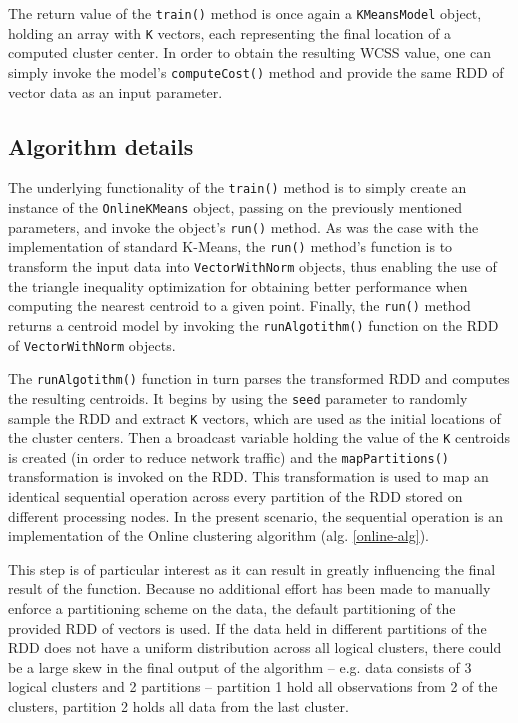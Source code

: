 \documentclass{l4proj}
\begin{document}
The return value of the \texttt{train()} method is once again a  \texttt{KMeansModel} object, holding an array with \texttt{K} vectors, each representing the final location of a computed cluster center. In order to obtain the resulting WCSS value, one can simply invoke the model's \texttt{computeCost()} method and provide the same RDD of vector data as an input parameter.

\subsection{Algorithm details}

The underlying functionality of the \texttt{train()} method is to simply create an instance of the \texttt{OnlineKMeans} object, passing on the previously mentioned parameters, and invoke the object's \texttt{run()} method. As was the case with the implementation of standard K-Means, the \texttt{run()} method's function is to transform the input data into \texttt{VectorWithNorm} objects, thus enabling the use of the triangle inequality optimization for obtaining better performance when computing the nearest centroid to a given point\cite{Triangle}. Finally, the \texttt{run()} method returns a centroid model by invoking the \texttt{runAlgotithm()} function on the RDD of \texttt{VectorWithNorm} objects.

The \texttt{runAlgotithm()} function in turn parses the transformed RDD and computes the resulting centroids. It begins by using the \texttt{seed} parameter to randomly sample the RDD and extract \texttt{K} vectors, which are used as the initial locations of the cluster centers. Then a broadcast variable holding the value of the \texttt{K} centroids is created (in order to reduce network traffic) and the \texttt{mapPartitions()} transformation is invoked on the RDD. This transformation is used to map an identical sequential operation across every partition of the RDD stored on different processing nodes. In the present scenario, the sequential operation is an implementation of the Online clustering algorithm (alg. \ref{online-alg}).

This step is of particular interest as it can result in greatly influencing the final result of the function. Because no additional effort has been made to manually enforce a partitioning scheme on the data, the default partitioning of the provided RDD of vectors is used. If the data held in different partitions of the RDD does not have a uniform distribution across all logical clusters, there could be a large skew in the final output of the algorithm -- e.g. data consists of 3 logical clusters and 2 partitions -- partition 1 hold all observations from 2 of the clusters, partition 2 holds all data from the last cluster.
\end{document}

